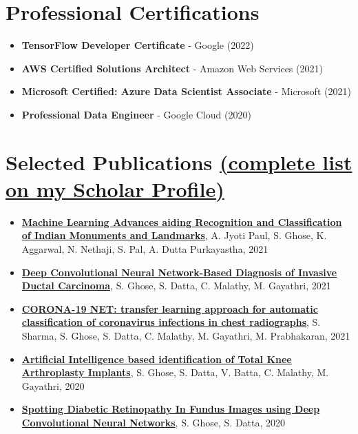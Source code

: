 \documentclass[letterpaper,11pt]{article}
\newcommand{\resumeItem}[1]{
  \item\small{
    {#1 \vspace{-2pt}}
  }
}
\newcommand{\resumeSubHeadingListStart}{\begin{itemize}[leftmargin=0.0in, label={}]}
\newcommand{\resumeSubHeadingListEnd}{\end{itemize}}
\newcommand{\resumeItemListStart}{\begin{itemize}}
\newcommand{\resumeItemListEnd}{\end{itemize}\vspace{-5pt}}
\begin{document}
\section{Professional Certifications}
\resumeSubHeadingListStart
  \resumeItemListStart
    \resumeItem{\textbf{\textcolor{maincolor}{TensorFlow Developer Certificate}} - Google (2022)}
    \resumeItem{\textbf{\textcolor{maincolor}{AWS Certified Solutions Architect}} - Amazon Web Services (2021)}
    \resumeItem{\textbf{\textcolor{maincolor}{Microsoft Certified: Azure Data Scientist Associate}} - Microsoft (2021)}
    \resumeItem{\textbf{\textcolor{maincolor}{Professional Data Engineer}} - Google Cloud (2020)}
  \resumeItemListEnd
\resumeSubHeadingListEnd

\section{Selected Publications \href{https://scholar.google.com/citations?user=Dv5UOCkAAAAJ\&hl=en}{\textcolor{maincolor}{(complete list on my Scholar Profile)}}}
\resumeSubHeadingListStart
  \resumeItemListStart
    \resumeItem{\textbf{\href{https://arxiv.org/abs/2107.14070}{\textcolor{maincolor}{Machine Learning Advances aiding Recognition and Classification of Indian Monuments and Landmarks}}}, A. Jyoti Paul, S. Ghose, K. Aggarwal, N. Nethaji, S. Pal, A. Dutta Purkayastha, 2021}
    \resumeItem{\textbf{\href{https://link.springer.com/chapter/10.1007/978-981-16-0507-9_7}{\textcolor{maincolor}{Deep Convolutional Neural Network-Based Diagnosis of Invasive Ductal Carcinoma}}}, S. Ghose, S. Datta, C. Malathy, M. Gayathri, 2021}
    \resumeItem{\textbf{\href{https://link.springer.com/chapter/10.1007/978-3-030-66665-1_40}{\textcolor{maincolor}{CORONA-19 NET: transfer learning approach for automatic classification of coronavirus infections in chest radiographs}}}, S. Sharma, S. Ghose, S. Datta, C. Malathy, M. Gayathri, M. Prabhakaran, 2021}
    \resumeItem{\textbf{\href{https://ieeexplore.ieee.org/document/9297900}{\textcolor{maincolor}{Artificial Intelligence based identification of Total Knee Arthroplasty Implants}}}, S. Ghose, S. Datta, V. Batta, C. Malathy, M. Gayathri, 2020}
    \resumeItem{\textbf{\href{https://ijrar.org/papers/IJRAR19W1638.pdf}{\textcolor{maincolor}{Spotting Diabetic Retinopathy In Fundus Images using Deep Convolutional Neural Networks}}}, S. Ghose, S. Datta, 2020}
  \resumeItemListEnd
\resumeSubHeadingListEnd
\end{document}
